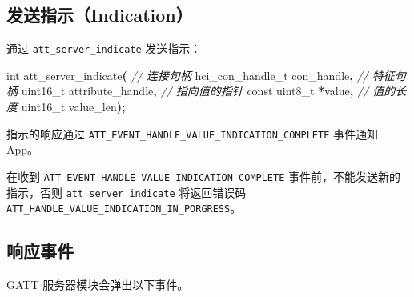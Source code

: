 \documentclass[
  12pt,
]{book}
\makeatletter
\newenvironment{Shaded}{\begin{snugshade}}{\end{snugshade}}
\newcommand{\CommentTok}[1]{\textcolor[rgb]{0.56,0.35,0.01}{\textit{#1}}}
\newcommand{\DataTypeTok}[1]{\textcolor[rgb]{0.13,0.29,0.53}{#1}}
\newcommand{\NormalTok}[1]{#1}
\newcommand{\OperatorTok}[1]{\textcolor[rgb]{0.81,0.36,0.00}{\textbf{#1}}}
\newenvironment{kframe}{%
\medskip{}
\setlength{\fboxsep}{.8em}
 \def\at@end@of@kframe{}%
 \ifinner\ifhmode%
  \def\at@end@of@kframe{\end{minipage}}%
  \begin{minipage}{\columnwidth}%
 \fi\fi%
 \def\FrameCommand##1{\hskip\@totalleftmargin \hskip-\fboxsep
 \colorbox{shadecolor}{##1}\hskip-\fboxsep
     \hskip-\linewidth \hskip-\@totalleftmargin \hskip\columnwidth}%
 \MakeFramed {\advance\hsize-\width
   \@totalleftmargin\z@ \linewidth\hsize
   \@setminipage}}%
 {\par\unskip\endMakeFramed%
 \at@end@of@kframe}
\newenvironment{rmdblock}[1]
  {
  \begin{itemize}
  \renewcommand{\labelitemi}{
    \raisebox{-.7\height}[0pt][0pt]{
      {\setkeys{Gin}{width=3em,keepaspectratio}\texttt{[image: images/\#1]}}
    }
  }
  \setlength{\fboxsep}{1em}
  \begin{kframe}
  \item
  }
  {
  \end{kframe}
  \end{itemize}
  }
\newenvironment{rmdcaution}
  {\begin{rmdblock}{caution}}
  {\end{rmdblock}}
\makeatother
\begin{document}
\hypertarget{ux53d1ux9001ux6307ux793aindication}{%
\subsection{发送指示（Indication）}\label{ux53d1ux9001ux6307ux793aindication}}

通过 \texttt{att\_server\_indicate} 发送指示：

\begin{Shaded}
\begin{Highlighting}[]
\DataTypeTok{int}\NormalTok{ att\_server\_indicate}\OperatorTok{(}
  \CommentTok{// 连接句柄}
\NormalTok{  hci\_con\_handle\_t con\_handle}\OperatorTok{,}
  \CommentTok{// 特征句柄}
  \DataTypeTok{uint16\_t}\NormalTok{ attribute\_handle}\OperatorTok{,}
  \CommentTok{// 指向值的指针}
  \DataTypeTok{const} \DataTypeTok{uint8\_t} \OperatorTok{*}\NormalTok{value}\OperatorTok{,}
  \CommentTok{// 值的长度}
  \DataTypeTok{uint16\_t}\NormalTok{ value\_len}\OperatorTok{);}
\end{Highlighting}
\end{Shaded}

指示的响应通过 \texttt{ATT\_EVENT\_HANDLE\_VALUE\_INDICATION\_COMPLETE} 事件通知 App。

\begin{rmdcaution}
在收到 \texttt{ATT\_EVENT\_HANDLE\_VALUE\_INDICATION\_COMPLETE}
事件前，不能发送新的指示，否则 \texttt{att\_server\_indicate}
将返回错误码 \texttt{ATT\_HANDLE\_VALUE\_INDICATION\_IN\_PORGRESS}。
\end{rmdcaution}

\hypertarget{ux54cdux5e94ux4e8bux4ef6}{%
\subsection{响应事件}\label{ux54cdux5e94ux4e8bux4ef6}}

GATT 服务器模块会弹出以下事件。
\end{document}
